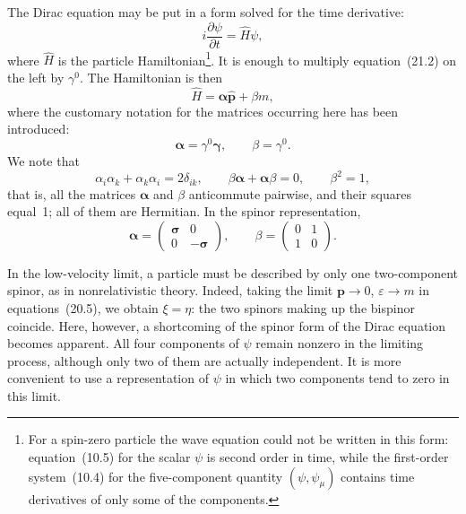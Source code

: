 The Dirac equation may be put in a form solved for the time derivative:
\begin{equation}
i\frac{\partial\psi}{\partial t} = \widehat H\psi,
\tag{21.12}
\end{equation}
where $\widehat H$ is the particle Hamiltonian\footnote{For a spin-zero particle the wave equation could not be written in this form: equation~(10.5) for the scalar $\psi$ is second order in time, while the first-order system~(10.4) for the five-component quantity $(\psi, \psi_\mu)$ contains time derivatives of only some of the components.}. It is enough to multiply equation~(21.2) on the left by $\gamma^0$. The Hamiltonian is then
\begin{equation}
\widehat H = \boldsymbol{\alpha}\widehat{\mathbf{p}} + \beta m,
\tag{21.13}
\end{equation}
where the customary notation for the matrices occurring here has been introduced:
\begin{equation}
\boldsymbol{\alpha} = \gamma^0\boldsymbol{\gamma},\qquad \beta = \gamma^0.
\tag{21.14}
\end{equation}
We note that
\begin{equation}
\alpha_i\alpha_k + \alpha_k\alpha_i = 2\delta_{ik},\qquad \beta\boldsymbol{\alpha} + \boldsymbol{\alpha}\beta = 0,\qquad \beta^2 = 1,
\tag{21.15}
\end{equation}
that is, all the matrices $\boldsymbol{\alpha}$ and $\beta$ anticommute pairwise, and their squares equal~1; all of them are Hermitian. In the spinor representation,
\begin{equation}
\boldsymbol{\alpha} = \begin{pmatrix} \boldsymbol{\sigma} & 0\\ 0 & -\boldsymbol{\sigma} \end{pmatrix},\qquad \beta = \begin{pmatrix} 0 & 1\\ 1 & 0 \end{pmatrix}.
\tag{21.16}
\end{equation}

In the low-velocity limit, a particle must be described by only one two-component spinor, as in nonrelativistic theory. Indeed, taking the limit $\mathbf{p} \to 0$, $\varepsilon \to m$ in equations~(20.5), we obtain $\xi = \eta$: the two spinors making up the bispinor coincide. Here, however, a shortcoming of the spinor form of the Dirac equation becomes apparent. All four components of $\psi$ remain nonzero in the limiting process, although only two of them are actually independent. It is more convenient to use a representation of $\psi$ in which two components tend to zero in this limit.

